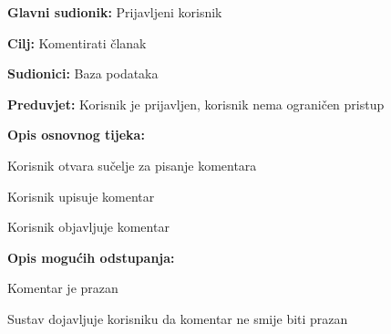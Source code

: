 \noindent {}
\begin{packed_item}

\item \textbf{Glavni sudionik:} Prijavljeni korisnik
\item  \textbf{Cilj:} Komentirati članak
\item  \textbf{Sudionici:} Baza podataka
\item  \textbf{Preduvjet:} Korisnik je prijavljen, korisnik nema ograničen pristup
\item  \textbf{Opis osnovnog tijeka:}

\item[] \begin{packed_enum}

    \item Korisnik otvara sučelje za pisanje komentara
    \item Korisnik upisuje komentar
    \item Korisnik objavljuje komentar

\end{packed_enum}

\item  \textbf{Opis mogućih odstupanja:}

\item[] \begin{packed_item}

    \item[3.a] Komentar je prazan
    \item[] \begin{packed_enum}

        \item Sustav dojavljuje korisniku da komentar ne smije biti prazan

    \end{packed_enum}

\end{packed_item}

\end{packed_item}

